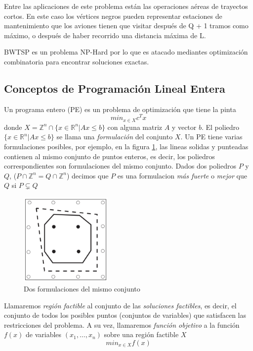 \documentclass[10pt, a4paper]{article}
\theoremstyle{definition}
\begin{document}
Entre las aplicaciones de este problema están las operaciones aéreas de trayectos cortos. En este caso los vértices negros pueden representar estaciones de mantenimiento que los aviones tienen que visitar después de Q + 1 tramos como máximo, o después de haber recorrido una distancia máxima de L.

BWTSP es un problema NP-Hard por lo que es atacado mediantes optimización combinatoria para encontrar soluciones exactas.

\subsection{Conceptos de Programación Lineal Entera}

Un programa entero (PE) es un problema de optimización que tiene la pinta
$$min_{x \in X} c^Tx$$
donde $X = \mathds{Z}^n \cap \{x \in \mathds{R}^n | Ax \leq b \}$ con alguna matriz $A$ y vector $b$. El poliedro $\{x \in \mathds{R}^n | Ax \leq b \}$ se llama una \textit{formulación} del conjunto $X$.
Un PE tiene varias formulaciones posibles, por ejemplo, en la figura \ref{fig:ejemplo_formulaciones}, las lineas solidas y punteadas contienen al mismo conjunto de puntos enteros, es decir, los poliedros correspondientes son formulaciones del mismo conjunto.
Dados dos poliedros $P$ y $Q$, ($P \cap \mathds{Z}^n = Q \cap \mathds{Z}^n$) decimos que $P$ es una formulacion \textit{más fuerte} o \textit{mejor} que $Q$ si $P \subsetneq Q$

\begin{figure}[H]
  \centering
  \includegraphics[width=0.4\textwidth]{ejemplo_formulaciones.png}
  \caption{Dos formulaciones del mismo conjunto}
  \label{fig:ejemplo_formulaciones}
\end{figure}


Llamaremos \textit{región factible} al conjunto de las \textit{soluciones factibles}, es decir, el conjunto de todos los posibles puntos (conjuntos de variables) que satisfacen las restricciones del problema.
A su vez, llamaremos \textit{función objetivo} a la  función $f(x)$ de variables $(x_1,\dots,x_n)$ sobre una región factible $X$
$$min_{x \in X} f(x)$$
\end{document}
